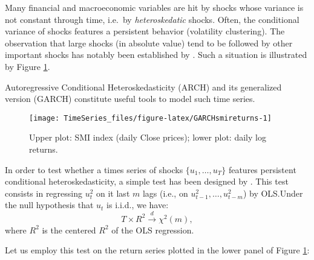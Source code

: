 \documentclass[
  12pt,
]{book}
\theoremstyle{definition}
\theoremstyle{definition}
\theoremstyle{definition}
\theoremstyle{definition}
\theoremstyle{remark}
\begin{document}
Many financial and macroeconomic variables are hit by shocks whose variance is not constant through time, i.e.~by \emph{heteroskedatic} shocks. Often, the conditional variance of shocks features a persistent behavior (volatility clustering). The observation that large shocks (in absolute value) tend to be followed by other important shocks has notably been established by \citet{Mandelbrot_1963}. Such a situation is illustrated by Figure \ref{fig:GARCHsmireturns}.

Autoregressive Conditional Heteroskedasticity (ARCH) and its generalized version (GARCH) constitute useful tools to model such time series.

\begin{figure}
\texttt{[image: TimeSeries\_files/figure-latex/GARCHsmireturns-1]} \caption{Upper plot: SMI index (daily Close prices); lower plot: daily log returns.}\label{fig:GARCHsmireturns}
\end{figure}

In order to test whether a times series of shocks \(\{u_1,\dots,u_T\}\) features persistent conditional heteroskedasticity, a simple test has been designed by \citet{Engle_1982}. This test consists in regressing \(u_t^2\) on it last \(m\) lags (i.e., on \(u_{t-1}^2,\dots,u_{t-m}^2\)) by OLS.Under the null hypothesis that \(u_t\) is i.i.d., we have:
\[
T \times R^2 \overset{d}{\rightarrow} \chi^2(m),
\]
where \(R^2\) is the centered \(R^2\) of the OLS regression.

Let us employ this test on the return series plotted in the lower panel of Figure \ref{fig:GARCHsmireturns}:
\end{document}
